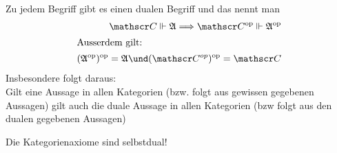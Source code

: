 \begin{folg}\enter
	Zu jedem Begriff gibt es einen dualen Begriff und das nennt man 
	\begin{align*}
		\Cat \Vdash \aussage \Longrightarrow \Cat^{\op} \Vdash \aussage^{\op}\\
		\intertext{Ausserdem gilt:}
		(\aussage^{\op})^{\op} = \aussage \und (\Cat^{op})^{\op} = \Cat
	\end{align*}
	Insbesondere folgt daraus:\\
	Gilt eine Aussage in allen Kategorien (bzw. folgt aus gewissen gegebenen Aussagen) gilt auch die duale Aussage in allen Kategorien (bzw folgt aus den dualen gegebenen Aussagen)
\end{folg}

\begin{bemerkung}
	Die Kategorienaxiome sind selbstdual!
\end{bemerkung}

